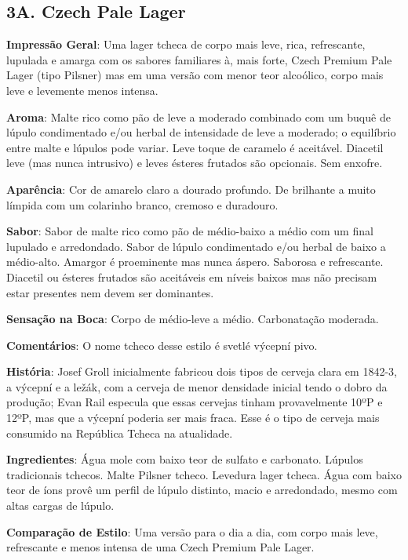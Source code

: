 \subsection*{3A. Czech Pale Lager}
\textbf{Impressão Geral}: Uma lager tcheca de corpo mais leve, rica, refrescante, lupulada e amarga com os sabores familiares à, mais forte, Czech Premium Pale Lager (tipo Pilsner) mas em uma versão com menor teor alcoólico, corpo mais leve e levemente menos intensa.

\textbf{Aroma}: Malte rico como pão de leve a moderado combinado com um buquê de lúpulo condimentado e/ou herbal de intensidade de leve a moderado; o equilíbrio entre malte e lúpulos pode variar. Leve toque de caramelo é aceitável. Diacetil leve (mas nunca intrusivo) e leves ésteres frutados são opcionais. Sem enxofre.

\textbf{Aparência}: Cor de amarelo claro a dourado profundo. De brilhante a muito límpida com um colarinho branco, cremoso e duradouro.

\textbf{Sabor}: Sabor de malte rico como pão de médio-baixo a médio com um final lupulado e arredondado. Sabor de lúpulo condimentado e/ou herbal de baixo a médio-alto. Amargor é proeminente mas nunca áspero. Saborosa e refrescante. Diacetil ou ésteres frutados são aceitáveis em níveis baixos mas não precisam estar presentes nem devem ser dominantes.

\textbf{Sensação na Boca}: Corpo de médio-leve a médio. Carbonatação moderada.

\textbf{Comentários}: O nome tcheco desse estilo é svetlé výcepní pivo.

\textbf{História}: Josef Groll inicialmente fabricou dois tipos de cerveja clara em 1842-3, a výcepní e a ležák, com a cerveja de menor densidade inicial tendo o dobro da produção; Evan Rail especula que essas cervejas tinham provavelmente 10ºP e 12ºP, mas que a výcepní poderia ser mais fraca. Esse é o tipo de cerveja mais consumido na República Tcheca na atualidade.

\textbf{Ingredientes}: Água mole com baixo teor de sulfato e carbonato. Lúpulos tradicionais tchecos. Malte Pilsner tcheco. Levedura lager tcheca. Água com baixo teor de íons provê um perfil de lúpulo distinto, macio e arredondado, mesmo com altas cargas de lúpulo.

\textbf{Comparação de Estilo}: Uma versão para o dia a dia, com corpo mais leve, refrescante e menos intensa de uma Czech Premium Pale Lager.


